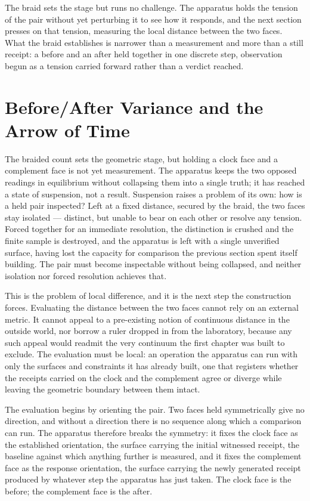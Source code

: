 The braid sets the stage but runs no challenge. The apparatus holds the tension of the pair without yet perturbing it to see how it responds, and the next section presses on that tension, measuring the local distance between the two faces. What the braid establishes is narrower than a measurement and more than a still receipt: a before and an after held together in one discrete step, observation begun as a tension carried forward rather than a verdict reached.


\section{Before/After Variance and the Arrow of Time}

The braided count sets the geometric stage, but holding a clock face and a complement face is not yet measurement. The apparatus keeps the two opposed readings in equilibrium without collapsing them into a single truth; it has reached a state of suspension, not a result. Suspension raises a problem of its own: how is a held pair inspected? Left at a fixed distance, secured by the braid, the two faces stay isolated --- distinct, but unable to bear on each other or resolve any tension. Forced together for an immediate resolution, the distinction is crushed and the finite sample is destroyed, and the apparatus is left with a single unverified surface, having lost the capacity for comparison the previous section spent itself building. The pair must become inspectable without being collapsed, and neither isolation nor forced resolution achieves that.

This is the problem of local difference, and it is the next step the construction forces. Evaluating the distance between the two faces cannot rely on an external metric. It cannot appeal to a pre-existing notion of continuous distance in the outside world, nor borrow a ruler dropped in from the laboratory, because any such appeal would readmit the very continuum the first chapter was built to exclude. The evaluation must be local: an operation the apparatus can run with only the surfaces and constraints it has already built, one that registers whether the receipts carried on the clock and the complement agree or diverge while leaving the geometric boundary between them intact.

The evaluation begins by orienting the pair. Two faces held symmetrically give no direction, and without a direction there is no sequence along which a comparison can run. The apparatus therefore breaks the symmetry: it fixes the clock face as the established orientation, the surface carrying the initial witnessed receipt, the baseline against which anything further is measured, and it fixes the complement face as the response orientation, the surface carrying the newly generated receipt produced by whatever step the apparatus has just taken. The clock face is the before; the complement face is the after.

